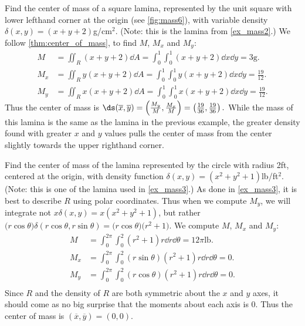 \begin{example}\label{ex_mass7}%
Find the center of mass of a square lamina, represented by the unit square with lower lefthand corner at the origin (see \autoref{fig:mass6}), with variable density $\delta(x,y) = (x+y+2)$g/cm$^2$. (Note: this is the lamina from \autoref{ex_mass2}.)
\solution
We follow \autoref{thm:center_of_mass}, to find $M$, $M_x$ and $M_y$:
\begin{align*}
M &= \iint_R (x+y+2)\dd A = \int_0^1\int_0^1 (x+y+2)\dd x\dd y =3\text{g}.\\
M_x &= \iint_R y(x+y+2)\dd A = \int_0^1\int_0^1 y(x+y+2)\dd x\dd y =\frac{19}{12}.\\
M_y &= \iint_R x(x+y+2)\dd A = \int_0^1\int_0^1 x(x+y+2)\dd x\dd y =\frac{19}{12}.
\end{align*}
Thus the center of mass is $\ds (\overline{x},\overline{y}) = \left(\frac{M_y}M,\frac{M_x}M\right) = \left(\frac{19}{36},\frac{19}{36}\right)%
.$ While the mass of this lamina is the same as the lamina in the previous example, the greater density found with greater $x$ and $y$ values pulls the center of mass from the center slightly towards the upper righthand corner.
\end{example}

\begin{example}\label{ex_mass8}%
Find the center of mass of the lamina represented by the circle with radius 2ft, centered at the origin, with density function $\delta(x,y) = (x^2+y^2+1)$lb/ft$^2$. (Note: this is one of the lamina used in \autoref{ex_mass3}.)
\solution
As done in \autoref{ex_mass3}, it is best to describe $R$ using polar coordinates.
Thus when we compute $M_y$, we will integrate not $x\delta(x,y) = x(x^2+y^2+1)$, but rather $\bigl(r\cos\theta\bigr)\delta(r\cos\theta,r\sin\theta) = \bigl(r\cos\theta\bigr)\bigl(r^2+1\bigr).$ We compute $M$, $M_x$ and $M_y$:
\begin{align*}
M &= \int_0^{2\pi}\int_0^2 (r^2+1)r\dd r\dd\theta = 12\pi%
\text{lb}.\\
M_x &= \int_0^{2\pi}\int_0^2 (r\sin\theta)(r^2+1)r \dd r\dd\theta = 0.\\
M_y &= \int_0^{2\pi}\int_0^2 (r\cos\theta)(r^2+1)r \dd r\dd\theta = 0.\\
\end{align*}
Since $R$ and the density of $R$ are both symmetric about the $x$ and $y$ axes, it should come as no big surprise that the moments about each axis is 0. Thus the center of mass is $(\overline{x},\overline{y})=(0,0)$.
\end{example}

